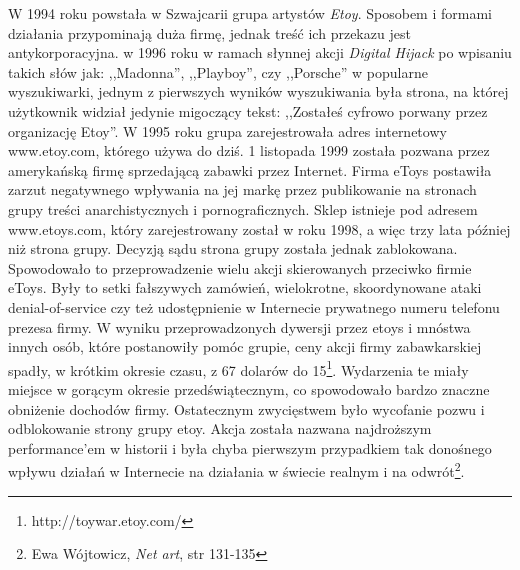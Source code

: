 \documentclass[a4paper,12pt,twoside]{article}
\begin{document}
W 1994 roku powstała w Szwajcarii grupa artystów \textit{Etoy}. Sposobem
i formami działania przypominają duża firmę, jednak treść ich przekazu jest
antykorporacyjna. w 1996 roku w ramach słynnej akcji \textit{Digital Hijack}
po wpisaniu takich słów jak: ,,Madonna'', ,,Playboy'', czy ,,Porsche''
w popularne wyszukiwarki, jednym z pierwszych wyników wyszukiwania była strona,
na której użytkownik widział jedynie migoczący tekst: ,,Zostałeś cyfrowo
porwany przez organizację Etoy''.
W 1995 roku grupa zarejestrowała adres internetowy www.etoy.com, którego
używa do dziś. 1 listopada 1999 została pozwana przez amerykańską firmę
sprzedającą zabawki przez Internet. Firma eToys postawiła zarzut
negatywnego wpływania na jej markę przez publikowanie na stronach grupy
treści anarchistycznych i pornograficznych. Sklep istnieje pod adresem
www.etoys.com, który zarejestrowany został w roku 1998, a więc trzy
lata później niż strona grupy. Decyzją sądu strona grupy została jednak
zablokowana. Spowodowało to przeprowadzenie wielu akcji skierowanych
przeciwko firmie eToys. Były to setki fałszywych zamówień, wielokrotne,
skoordynowane ataki denial-of-service czy też udostępnienie w Internecie
prywatnego numeru telefonu prezesa firmy. W wyniku przeprowadzonych
dywersji przez etoys i mnóstwa innych osób, które postanowiły pomóc grupie,
ceny akcji firmy zabawkarskiej spadły, w krótkim okresie czasu,
z 67 dolarów do 15\footnote{http://toywar.etoy.com/}.
Wydarzenia te miały miejsce w gorącym okresie
przedświątecznym, co spowodowało bardzo znaczne obniżenie dochodów firmy.
Ostatecznym zwycięstwem było wycofanie pozwu i odblokowanie strony grupy
etoy. Akcja została nazwana najdroższym performance'em w historii i była
chyba pierwszym przypadkiem tak donośnego wpływu działań w Internecie
na działania w świecie realnym i na
odwrót\footnote{Ewa Wójtowicz, \textit{Net art}, str 131-135}.
\end{document}
